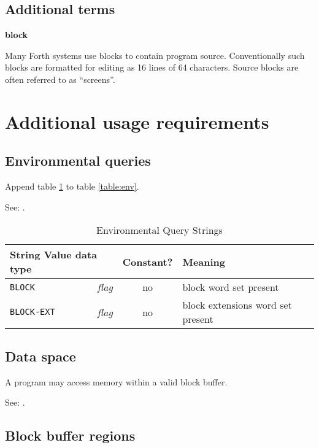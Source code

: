 \begin{info}
\subsection{Additional terms}

\textbf{block}

Many Forth systems use blocks to contain program source.
Conventionally such blocks are formatted for editing as
16 lines of 64 characters. Source blocks are often referred
to as ``screens''.
\end{info}

\section{Additional usage requirements} %

\subsection{Environmental queries} %

Append table \ref{block:env} to table \ref{table:env}.

See: .

\begin{table}[h]
  \begin{center}
	\caption{Environmental Query Strings}
	\label{block:env}
	\begin{tabular}{p{9em}rcp{}}
		\hline\hline
		\multicolumn{2}{l}{String \hfill Value data type} & Constant? & Meaning \\
		\hline
		\texttt{BLOCK}		& \emph{flag}	& no	&
			block word set present \\
		\texttt{BLOCK-EXT}	& \emph{flag}	& no	&
			block extensions word set present \\
		\hline\hline
	\end{tabular}
  \end{center}
\end{table}

\subsection{Data space} %

A program may access memory within a valid block buffer.

See: .

\subsection{Block buffer regions} %
\label{block:buffers}

